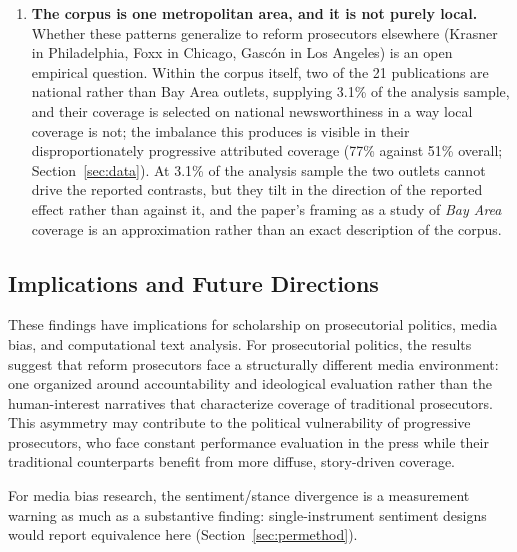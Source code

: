 \documentclass[12pt, letterpaper]{article}
\begin{document}
\begin{enumerate}[leftmargin=*, itemsep=6pt]
\item \textbf{The corpus is one metropolitan area, and it is not purely local.} Whether these patterns generalize to reform prosecutors elsewhere (Krasner in Philadelphia, Foxx in Chicago, Gasc\'{o}n in Los Angeles) is an open empirical question. Within the corpus itself, two of the 21 publications are national rather than Bay Area outlets, supplying 3.1\% of the analysis sample, and their coverage is selected on national newsworthiness in a way local coverage is not; the imbalance this produces is visible in their disproportionately progressive attributed coverage (77\% against 51\% overall; Section~\ref{sec:data}). At 3.1\% of the analysis sample the two outlets cannot drive the reported contrasts, but they tilt in the direction of the reported effect rather than against it, and the paper's framing as a study of \emph{Bay Area} coverage is an approximation rather than an exact description of the corpus.

\end{enumerate}

\subsection{Implications and Future Directions}

These findings have implications for scholarship on prosecutorial politics, media bias, and computational text analysis. For prosecutorial politics, the results suggest that reform prosecutors face a structurally different media environment: one organized around accountability and ideological evaluation rather than the human-interest narratives that characterize coverage of traditional prosecutors. This asymmetry may contribute to the political vulnerability of progressive prosecutors, who face constant performance evaluation in the press while their traditional counterparts benefit from more diffuse, story-driven coverage.

For media bias research, the sentiment/stance divergence is a measurement warning as much as a substantive finding: single-instrument sentiment designs would report equivalence here (Section~\ref{sec:permethod}).
\end{document}
